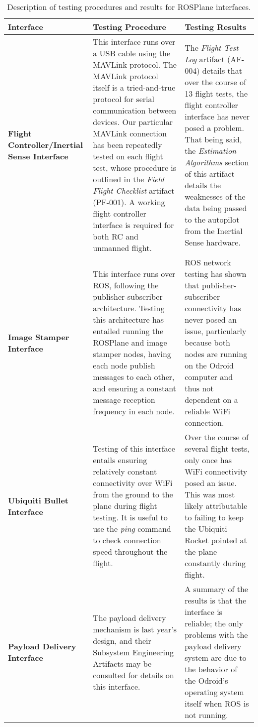 \documentclass[]{auvsi_doc}
\begin{document}
\begin{center}
	\begin{longtable}[H]{|P{4cm}|P{5.25cm}|P{5.25cm}|}
		\caption{Description of testing procedures and results for ROSPlane interfaces.}
		\label{tab:inttests}\\
		\hline
		{\color[HTML]{000000} \textbf{Interface}} & {\color[HTML]{000000}\textbf{Testing Procedure}}	& {\color[HTML]{000000}\textbf{Testing Results}} \\
		\hline
		\textbf{Flight Controller/Inertial Sense Interface}	& This interface runs over a USB cable using the MAVLink protocol. The MAVLink protocol itself is a tried-and-true protocol for serial communication between devices. Our particular MAVLink connection has been repeatedly tested on each flight test, whose procedure is outlined in the \textit{Field Flight Checklist} artifact (PF-001). A working flight controller interface is required for both RC and unmanned flight. &	The \textit{Flight Test Log} artifact (AF-004) details that over the course of 13 flight tests, the flight controller interface has never posed a problem. That being said, the \textit{Estimation Algorithms} section of this artifact details the weaknesses of the data being passed to the autopilot from the Inertial Sense hardware.\\
		\hline
		\textbf{Image Stamper Interface}	& This interface runs over ROS, following the publisher-subscriber architecture. Testing this architecture has entailed running the ROSPlane and image stamper nodes, having each node publish messages to each other, and ensuring a constant message reception frequency in each node. &	ROS network testing has shown that publisher-subscriber connectivity has never posed an issue, particularly because both nodes are running on the Odroid computer and thus not dependent on a reliable WiFi connection. \\
		\hline
		\textbf{Ubiquiti Bullet Interface}	& Testing of this interface entails ensuring relatively constant connectivity over WiFi from the ground to the plane during flight testing. It is useful to use the \textit{ping} command to check connection speed throughout the flight. &	Over the course of several flight tests, only once has WiFi connectivity posed an issue. This was most likely attributable to failing to keep the Ubiquiti Rocket pointed at the plane constantly during flight. \\
		\hline
		\textbf{Payload Delivery Interface}	& The payload delivery mechanism is last year's design, and their Subsystem Engineering Artifacts may be consulted for details on this interface. &	A summary of the results is that the interface is reliable; the only problems with the payload delivery system are due to the behavior of the Odroid's operating system itself when ROS is not running. \\
		\hline
	\end{longtable}
\end{center}
\end{document}
